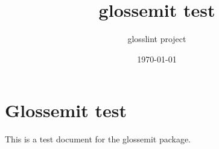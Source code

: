 \documentclass[a4paper]{article}
\title{\bfseries glossemit test}
\author{glosslint project}
\date{\today}
\begin{document}
\maketitle

\section{Glossemit test}

This is a test document for the glossemit package. 


\end{document}
